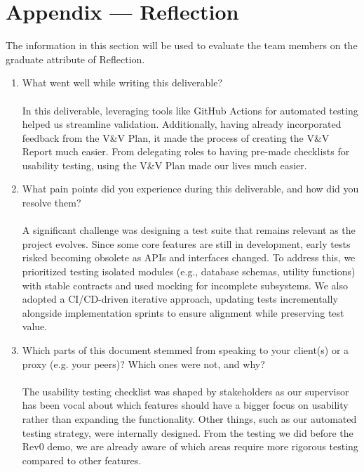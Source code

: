 \documentclass[12pt, titlepage]{article}
\begin{document}
\newpage{}
\section*{Appendix --- Reflection}

The information in this section will be used to evaluate the team members on the
graduate attribute of Reflection.



\begin{enumerate}
  \item What went well while writing this deliverable?\\
\\
In this deliverable, leveraging tools like GitHub Actions for automated testing helped us streamline validation. Additionally, having already incorporated feedback from the V\&V Plan, it made the process of creating the V\&V Report much easier. From delegating roles to having pre-made checklists for usability testing, using the V\&V Plan made our lives much easier.\\

  \item What pain points did you experience during this deliverable, and how
    did you resolve them?\\
\\
A significant challenge was designing a test suite that remains relevant as the project evolves. Since some core features are still in development, early tests risked becoming obsolete as APIs and interfaces changed. To address this, we prioritized testing isolated modules (e.g., database schemas, utility functions) with stable contracts and used mocking for incomplete subsystems. We also adopted a CI/CD-driven iterative approach, updating tests incrementally alongside implementation sprints to ensure alignment while preserving test value.\\

  \item Which parts of this document stemmed from speaking to your client(s) or
  a proxy (e.g. your peers)? Which ones were not, and why?\\
\\
The usability testing checklist was shaped by stakeholders as our supervisor has been vocal about which features should have a bigger focus on usability rather than expanding the functionality. Other things, such as our automated testing strategy, were internally designed. From the testing we did before the Rev0 demo, we are already aware of which areas require more rigorous testing compared to other features.\\
  

\end{enumerate}
\end{document}
